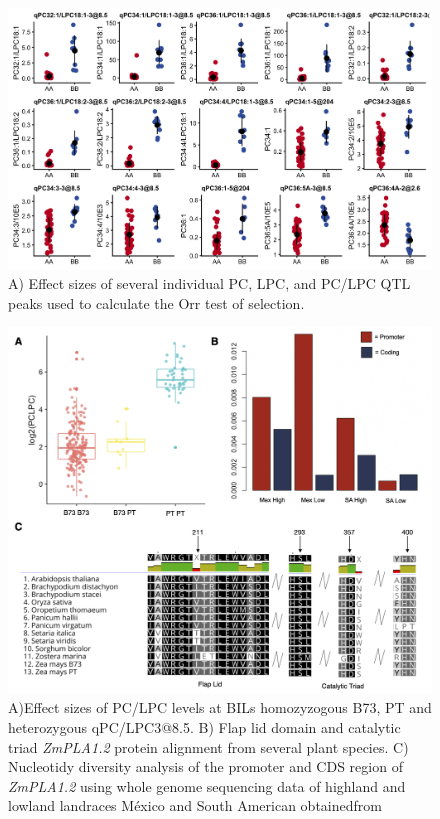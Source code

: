 \documentclass[9pt,twocolumn,twoside]{BioRxiv}
\begin{document}
\begin{figure}[t]
\begin{center}
\includegraphics[width=0.8\paperwidth]{Sup_Figures/Sup_Fig_4.png}
\caption{A) Effect sizes of several individual PC, LPC, and PC/LPC QTL peaks used to calculate the Orr test of selection.  
}
\label{SupFig3}
\end{center}
\end{figure} 

\begin{figure}[t]
\begin{center}
\includegraphics[width=0.8\paperwidth]{Sup_Figures/Sup_Fig_5.png}
\caption{A)Effect sizes of PC/LPC levels at BILs homozyzogous B73, PT and heterozygous qPC/LPC3@8.5.
B) Flap lid domain and catalytic triad \textit{ZmPLA1.2} protein alignment from several plant species. 
C) Nucleotidy diversity analysis of the promoter and CDS region of \textit{ZmPLA1.2} using whole genome sequencing data of highland and lowland landraces México and South American obtainedfrom \cite{Wang2017-bc}
}
\label{SupFig6}
\end{center}
\end{figure} 
\end{document}
